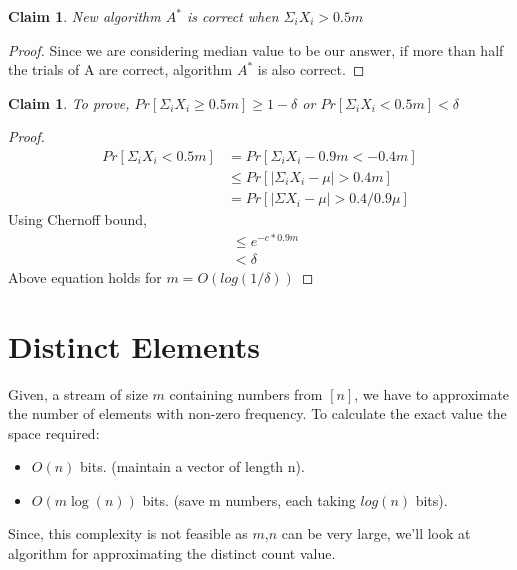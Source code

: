 \documentclass[11pt]{article}
\newtheorem{claim}[theorem]{Claim}
\begin{document}
\begin{claim}
New algorithm $A^{\ast}$ is correct when $\Sigma_{i} X_{i} > 0.5m$
\end{claim}

\begin{proof}
Since we are considering median value to be our answer, if more than half the trials of A are correct, algorithm $A^{\ast}$ is also correct.
\end{proof}

\begin{claim}
To prove, $Pr[\Sigma_{i} X_{i} \ge 0.5m] \ge 1-\delta$ or $Pr[\Sigma_{i} X_{i} < 0.5m] < \delta$
\end{claim}

\begin{proof}
\begin{equation}
\begin{split}
Pr[\Sigma_{i} X_{i} < 0.5m] & = Pr[\Sigma_{i} X_{i} - 0.9m < -0.4m]\\
& \le Pr[|\Sigma_{i} X_{i} - \mu| > 0.4m]\\
& = Pr[|\Sigma X_{i} - \mu| > 0.4/0.9 \mu]
\end{split}
\end{equation}
Using Chernoff bound,
\begin{equation}
\begin{split}
& \leq e^{-c*0.9m}\\
& < \delta
\end{split}
\end{equation}
Above equation holds for $m = O(log(1/\delta))$
\end{proof}

\section{Distinct Elements}
Given, a stream of size $m$ containing numbers from $[n]$, we have to approximate the number of elements with non-zero frequency. To calculate the exact value the space required:

\begin{itemize}
\item $O(n)$ bits. (maintain a vector of length n).
\item $O(m \log (n))$ bits. (save m numbers, each taking $log(n)$ bits).
\end{itemize}

Since, this complexity is not feasible as $m$,$n$ can be very large, we'll look at algorithm for approximating the distinct count value.
\end{document}
